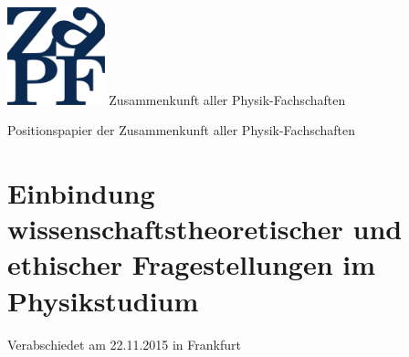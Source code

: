 \documentclass[DIV=calc]{scrartcl}
\begin{document}
\hspace{0.87\textwidth}
\begin{minipage}{120pt}
\vspace{-1.8cm}
\includegraphics[width=80pt]{logo.pdf}
\centering
\small Zusammenkunft aller Physik-Fachschaften
\end{minipage}
\begin{center}
\huge{Positionspapier der Zusammenkunft aller Physik-Fachschaften} \\
\normalsize
\end{center}

\vspace{1cm}
\section*{Einbindung wissenschaftstheoretischer und ethischer Fragestellungen im Physikstudium}




\vfill
\begin{flushright}
Verabschiedet am 22.11.2015 in Frankfurt
\end{flushright}
\end{document}
